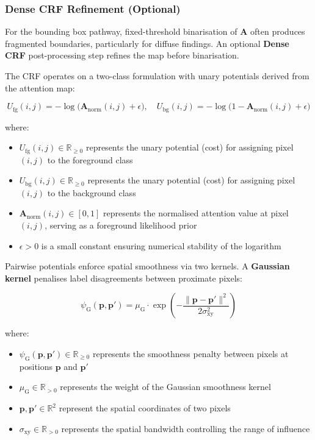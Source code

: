 \subsubsection{Dense CRF Refinement (Optional)}


For the bounding box pathway, fixed-threshold binarisation of $\mathbf{A}$ often produces fragmented boundaries, particularly for diffuse findings. An optional \textbf{Dense CRF} post-processing step refines the map before binarisation.

The CRF operates on a two-class formulation with unary potentials derived from the attention map:

$$
U_{\text{fg}}(i,j) = -\log\!\bigl(\mathbf{A}_{\text{norm}}(i,j) + \epsilon\bigr), \quad U_{\text{bg}}(i,j) = -\log\!\bigl(1 - \mathbf{A}_{\text{norm}}(i,j) + \epsilon\bigr)
$$

where:
\begin{itemize}
\item $U_{\text{fg}}(i,j) \in \mathbb{R}_{\geq 0}$ represents the unary potential (cost) for assigning pixel $(i,j)$ to the foreground class
\item $U_{\text{bg}}(i,j) \in \mathbb{R}_{\geq 0}$ represents the unary potential (cost) for assigning pixel $(i,j)$ to the background class
\item $\mathbf{A}_{\text{norm}}(i,j) \in [0,1]$ represents the normalised attention value at pixel $(i,j)$, serving as a foreground likelihood prior
\item $\epsilon > 0$ is a small constant ensuring numerical stability of the logarithm
\end{itemize}

Pairwise potentials enforce spatial smoothness via two kernels. A \textbf{Gaussian kernel} penalises label disagreements between proximate pixels:

$$
\psi_{\text{G}}(\mathbf{p}, \mathbf{p}') = \mu_{\text{G}} \cdot \exp\!\left(-\frac{\|\mathbf{p} - \mathbf{p}'\|^2}{2\sigma_{\text{xy}}^2}\right)
$$

where:
\begin{itemize}
\item $\psi_{\text{G}}(\mathbf{p}, \mathbf{p}') \in \mathbb{R}_{\geq 0}$ represents the smoothness penalty between pixels at positions $\mathbf{p}$ and $\mathbf{p}'$
\item $\mu_{\text{G}} \in \mathbb{R}_{>0}$ represents the weight of the Gaussian smoothness kernel
\item $\mathbf{p}, \mathbf{p}' \in \mathbb{R}^2$ represent the spatial coordinates of two pixels
\item $\sigma_{\text{xy}} \in \mathbb{R}_{>0}$ represents the spatial bandwidth controlling the range of influence
\end{itemize}

